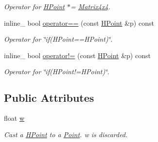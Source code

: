 \begin{DoxyCompactItemize}
\begin{DoxyCompactList}\small\item\em Operator for \hyperlink{classOpcode_1_1HPoint}{H\+Point} $\ast$= \hyperlink{classOpcode_1_1Matrix4x4}{Matrix4x4}. \end{DoxyCompactList}\item 
inline\+\_\+ bool \hyperlink{classOpcode_1_1HPoint_a8022a05d97020629b6062174e150c5a2}{operator==} (const \hyperlink{classOpcode_1_1HPoint}{H\+Point} \&p) const \hypertarget{classOpcode_1_1HPoint_a8022a05d97020629b6062174e150c5a2}{}\label{classOpcode_1_1HPoint_a8022a05d97020629b6062174e150c5a2}

\begin{DoxyCompactList}\small\item\em Operator for \char`\"{}if(\+H\+Point==\+H\+Point)\char`\"{}. \end{DoxyCompactList}\item 
inline\+\_\+ bool \hyperlink{classOpcode_1_1HPoint_a4d7fb88abdac1a478b5acbc724deacf3}{operator!=} (const \hyperlink{classOpcode_1_1HPoint}{H\+Point} \&p) const \hypertarget{classOpcode_1_1HPoint_a4d7fb88abdac1a478b5acbc724deacf3}{}\label{classOpcode_1_1HPoint_a4d7fb88abdac1a478b5acbc724deacf3}

\begin{DoxyCompactList}\small\item\em Operator for \char`\"{}if(\+H\+Point!=\+H\+Point)\char`\"{}. \end{DoxyCompactList}\end{DoxyCompactItemize}
\subsection*{Public Attributes}
\begin{DoxyCompactItemize}
\item 
float \hyperlink{classOpcode_1_1HPoint_a19917d69a25c616a52480e46b27fa660}{w}\hypertarget{classOpcode_1_1HPoint_a19917d69a25c616a52480e46b27fa660}{}\label{classOpcode_1_1HPoint_a19917d69a25c616a52480e46b27fa660}

\begin{DoxyCompactList}\small\item\em Cast a \hyperlink{classOpcode_1_1HPoint}{H\+Point} to a \hyperlink{classOpcode_1_1Point}{Point}. w is discarded. \end{DoxyCompactList}\end{DoxyCompactItemize}
